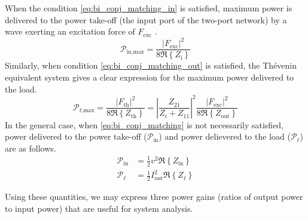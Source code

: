 \documentclass[lettersize,journal]{IEEEtran}
\begin{document}
When the condition \eqref{eq:bi_conj_matching_in} is satisfied, maximum power is delivered to the power take-off (the input port of the two-port network) by a wave exerting an excitation force of $F_{\textrm{exc}}$ \cite{Falnes:2002aa}.
%
\begin{equation}
        \mathcal{P}_{\textrm{in,max}} = \frac{| F_{\textrm{exc}} |^2 }{ 8 \Re \left\{ Z_{\textrm{i}} \right\} }
\end{equation}
%
Similarly, when condition \eqref{eq:bi_conj_matching_out} is satisfied, the Th\'{e}venin equivalent system gives a clear expression for the maximum power delivered to the load.
%
\begin{equation}
        \mathcal{P}_{\ell\textrm{,max}} = \frac{| F_{\textrm{th}} |^2 }{ 8 \Re \left\{ Z_{\textrm{th}} \right\} }
        = \left| \frac{ Z_{21} }{ Z_i + Z_{11} } \right| ^2 \frac{ | F_{\textrm{exc}} |^2 }{ 8 \Re \left\{ Z_{\textrm{out}} \right\} } \label{eq:max_power_delivered_thevenin}
\end{equation}
%
In the general case, when \eqref{eq:bi_conj_matching} is not necessarily satisfied, power delivered to the power take-off ($\mathcal{P}_{\textrm{in}}$) and power delievered to the load ($\mathcal{P}_\ell$) are as follows.
\begin{subequations}
        \begin{align}
                \mathcal{P}_{\textrm{in}} &= \frac{1}{2} v^2 \Re \left\{ Z_{\textrm{in}} \right\}\\
                \mathcal{P}_\ell &= \frac{1}{2} I_{\textrm{out}}^2 \Re \left\{ Z_{\ell} \right\}
        \end{align}
\end{subequations}

Using these quantities, we may express three power gains (ratios of output power to input power) that are useful for system analysis. 
\end{document}
